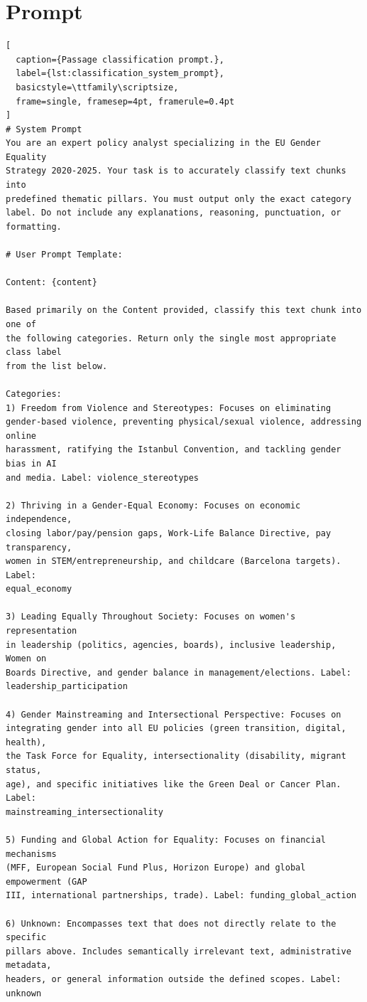 \documentclass[pdflatex, sn-apa]{sn-jnl}%
\theoremstyle{thmstyleone}%
\theoremstyle{thmstyletwo}%
\theoremstyle{thmstylethree}%
\begin{document}



\appendix
{}
\section{Prompt}

\begin{lstlisting}[
  caption={Passage classification prompt.},
  label={lst:classification_system_prompt},
  basicstyle=\ttfamily\scriptsize,
  frame=single, framesep=4pt, framerule=0.4pt
]
# System Prompt
You are an expert policy analyst specializing in the EU Gender Equality
Strategy 2020-2025. Your task is to accurately classify text chunks into
predefined thematic pillars. You must output only the exact category
label. Do not include any explanations, reasoning, punctuation, or formatting.

# User Prompt Template:
       
Content: {content}         

Based primarily on the Content provided, classify this text chunk into one of
the following categories. Return only the single most appropriate class label 
from the list below. 

Categories:
1) Freedom from Violence and Stereotypes: Focuses on eliminating
gender-based violence, preventing physical/sexual violence, addressing online
harassment, ratifying the Istanbul Convention, and tackling gender bias in AI
and media. Label: violence_stereotypes

2) Thriving in a Gender-Equal Economy: Focuses on economic independence,
closing labor/pay/pension gaps, Work-Life Balance Directive, pay transparency,
women in STEM/entrepreneurship, and childcare (Barcelona targets). Label:
equal_economy

3) Leading Equally Throughout Society: Focuses on women's representation
in leadership (politics, agencies, boards), inclusive leadership, Women on
Boards Directive, and gender balance in management/elections. Label:
leadership_participation

4) Gender Mainstreaming and Intersectional Perspective: Focuses on
integrating gender into all EU policies (green transition, digital, health),
the Task Force for Equality, intersectionality (disability, migrant status,
age), and specific initiatives like the Green Deal or Cancer Plan. Label:
mainstreaming_intersectionality

5) Funding and Global Action for Equality: Focuses on financial mechanisms
(MFF, European Social Fund Plus, Horizon Europe) and global empowerment (GAP
III, international partnerships, trade). Label: funding_global_action

6) Unknown: Encompasses text that does not directly relate to the specific
pillars above. Includes semantically irrelevant text, administrative metadata,
headers, or general information outside the defined scopes. Label: unknown
\end{lstlisting}
\end{document}
